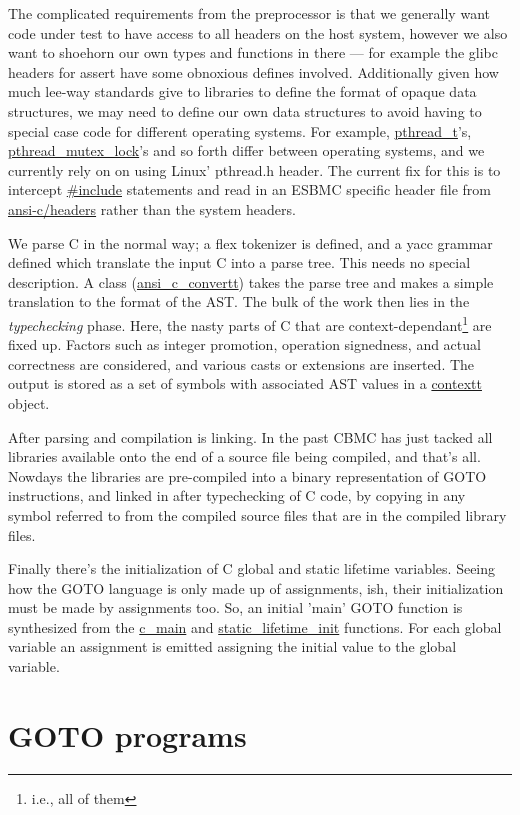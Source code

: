 \documentclass{article}
\begin{document}
The complicated requirements from the preprocessor is that we generally want
code under test to have access to all headers on the host system, however we
also want to shoehorn our own types and functions in there --- for example the
glibc headers for assert have some obnoxious defines involved. Additionally
given how much lee-way standards give to libraries to define the format of
opaque data structures, we may need to define our own data structures to
avoid having to special case code for different operating systems. For example,
\url{pthread_t}'s, \url{pthread_mutex_lock}'s and so forth differ
between operating systems, and we currently rely on on using Linux' pthread.h
header. The current fix for this is to intercept \url{\#include} statements
and read in an ESBMC specific header file from \url{ansi-c/headers} rather
than the system headers.

We parse C in the normal way; a flex tokenizer is defined, and a yacc grammar
defined which translate the input C into a parse tree. This needs no special
description. A class (\url{ansi_c_convertt}) takes the parse tree and
makes a simple translation to the format of the AST. The bulk of the work then
lies in the \textit{typechecking} phase. Here, the nasty parts of C that are
context-dependant\footnote{i.e., all of them} are fixed up. Factors such as
integer promotion, operation signedness, and actual correctness are
considered, and various casts or extensions are inserted. The output is stored
as a set of symbols with associated AST values in a \url{contextt} object.

After parsing and compilation is linking. In the past CBMC has just
tacked all libraries available onto the end of a source file being compiled,
and that's all. Nowdays the libraries are pre-compiled into a binary
representation of GOTO instructions, and linked in after typechecking of C
code, by copying in any symbol referred to from the compiled source files
that are in the compiled library files.

Finally there's the initialization of C global and static lifetime variables.
Seeing how the GOTO language is only made up of assignments, ish, their
initialization must be made by assignments too. So, an initial 'main' GOTO
function is synthesized from the \url{c_main} and
\url{static_lifetime_init} functions. For each global variable an
assignment is emitted assigning the initial value to the global variable.

\section{GOTO programs}
\end{document}
